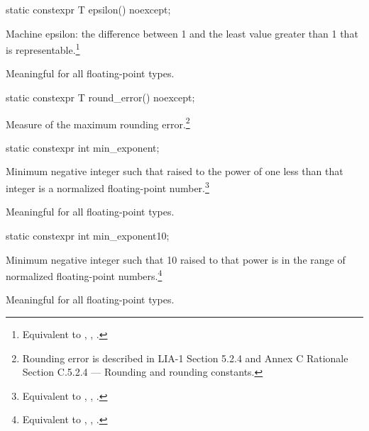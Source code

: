 %
\begin{itemdecl}
static constexpr T epsilon() noexcept;
\end{itemdecl}

\begin{itemdescr}
\pnum
Machine epsilon:  the difference between 1 and the least value greater than 1
that is representable.\footnote{Equivalent to , , .}

\pnum
Meaningful for all floating-point types.
\end{itemdescr}

%
\begin{itemdecl}
static constexpr T round_error() noexcept;
\end{itemdecl}

\begin{itemdescr}
\pnum
Measure of the maximum rounding error.\footnote{Rounding error is described in
LIA-1
Section 5.2.4 and
Annex C Rationale Section C.5.2.4 --- Rounding and rounding constants.}
\end{itemdescr}

%
\begin{itemdecl}
static constexpr int  min_exponent;
\end{itemdecl}

\begin{itemdescr}
\pnum
Minimum negative integer such that
raised to the power of one less than that integer is a normalized floating-point
number.\footnote{Equivalent to , ,
.}

\pnum
Meaningful for all floating-point types.
\end{itemdescr}

%
\begin{itemdecl}
static constexpr int  min_exponent10;
\end{itemdecl}

\begin{itemdescr}
\pnum
Minimum negative integer such that 10 raised to that power is in the range
of normalized floating-point numbers.\footnote{Equivalent to
, , .}

\pnum
Meaningful for all floating-point types.
\end{itemdescr}

